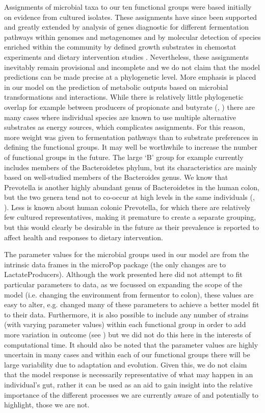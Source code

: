 \documentclass[a4paper]{article}
\begin{document}
Assignments of microbial taxa to our ten functional groups were based initially on evidence from cultured isolates. These assignments have since been supported and greatly extended by analysis of genes diagnostic for different fermentation pathways within genomes and metagenomes \citep{reichardt} and by molecular detection of species enriched within the community by defined growth substrates in chemostat experiments \citep{duncan16} and dietary intervention studies \citep{salonen}. Nevertheless, these assignments inevitably remain provisional and incomplete and we do not claim that the model predictions can be made precise at a phylogenetic level. More emphasis is placed in our model on the prediction of metabolic outputs based on microbial transformations and interactions. While there is relatively little phylogenetic overlap for example between producers of propionate and butyrate (\cite{reichardt}, \cite{louis17}) there are many cases where individual species are known to use multiple alternative substrates as energy sources, which complicates assignments. For this reason, more weight was given to fermentation pathways than to substrate preferences in defining the functional groups.  It may well be worthwhile to increase the number of functional groups in the future. The large ‘B’ group for example currently includes members of the Bacteroidetes phylum, but its characteristics are mainly based on well-studied members of the Bacteroides genus. We know that Prevotella is another highly abundant genus of Bacteroidetes in the human colon, but the two genera tend not to co-occur at high levels in the same individuals (\cite{wu}, \cite{chung}). Less is known about human colonic Prevotella, for which there are relatively few cultured representatives, making it premature to create a separate grouping, but this would clearly be desirable in the future as their prevalence is reported to affect health and responses to dietary intervention.


The parameter values for the microbial groups used in our model are from the intrinsic data frames in the microPop package (the only changes are to LactateProducers). 
Although the work presented here did not attempt to fit particular parameters to data, as we focussed on expanding the scope of the model (i.e. changing the environment from fermentor to colon), these values are easy to alter, e.g. \cite{wang} changed many of these parameters to achieve a better model fit to their data.
Furthermore, it is also possible to include any number of strains (with varying parameter values) within each functional group in order to add more variation in outcome (see \cite{Kettle2015}) but we did not do this here in the interests of computational time.
It should also be noted that the parameter values are highly uncertain in many cases and within each of our functional groups there will be large variability due to adaptation and evolution. 
Given this, we do not claim that the model response is necessarily representative of what may happen in an individual's gut, rather it can be used as an aid to gain insight into the relative importance of the different processes we are currently aware of and potentially to highlight, those we are not. 
\end{document}
